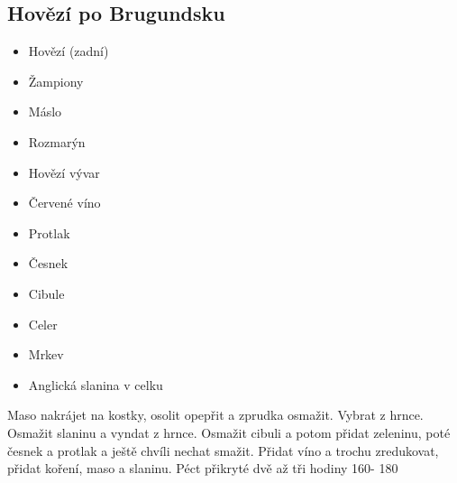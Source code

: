 \documentclass[10pt,a4paper]{article}
\newenvironment{myitemize}
{ \begin{itemize}
    \setlength{\itemsep}{0pt}
    \setlength{\parskip}{0pt}
    \setlength{\parsep}{0pt}     }
{ \end{itemize}                  }
\begin{document}
\subsection{Hovězí po Brugundsku}
\begin{minipage}[t]{0,5\textwidth}
\begin{myitemize} 
\item Hovězí (zadní)
\item Žampiony
\item Máslo
\item Rozmarýn
\item Hovězí vývar
\item Červené víno
\item Protlak
\item Česnek
\item Cibule
\item Celer
\item Mrkev
\item Anglická slanina v celku
\end{myitemize}
\end{minipage}
\begin{minipage}[t]{0,5\textwidth}
Maso nakrájet na kostky, osolit opepřit a zprudka osmažit. Vybrat z hrnce. Osmažit slaninu a vyndat z hrnce. Osmažit cibuli a potom přidat zeleninu, poté česnek a protlak a ještě chvíli nechat smažit. Přidat víno a trochu zredukovat, přidat koření, maso a slaninu. Péct přikryté dvě až tři hodiny 160\degree - 180\degree
\end{minipage}
\end{document}
